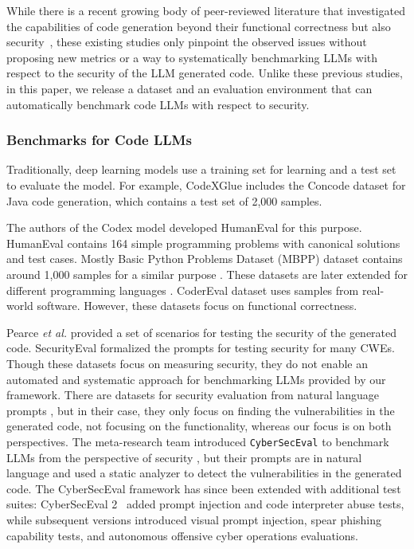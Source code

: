 \documentclass[pdflatex,sn-mathphys-ay]{sn-jnl}
\newcommand{\etal}{\textit{et al.} }
\begin{document}
While there is a recent growing body of peer-reviewed literature that investigated the capabilities of code generation beyond their functional correctness but also security~\cite{dakhel2023github,sobania2022choose,nguyen2022empirical,pearce2021,sandoval2022security,perry2022users},  these existing studies only pinpoint the observed issues without proposing new metrics or a way to systematically benchmarking LLMs with respect to the security of the LLM generated code. Unlike these previous studies, in this paper, we release a dataset and an evaluation environment that can automatically benchmark code LLMs with respect to security.



\subsubsection{Benchmarks for Code LLMs}

Traditionally, deep learning models use a training set for learning and a test set to evaluate the model. For example, CodeXGlue \cite{codexglue} includes the Concode dataset \cite{iyer2018mapping}  for Java code generation, which contains a test set of 2,000 samples. 


The authors of the Codex \cite{chen2021codex} model developed HumanEval for this purpose. HumanEval contains 164 simple programming problems with canonical solutions and test cases. Mostly Basic Python Problems Dataset (MBPP) dataset contains around 1,000 samples for a similar purpose \cite{austin2021program}. These datasets are later extended for different programming languages \cite{zheng2023codegeex, MBXP}. CoderEval dataset \cite{yu2023codereval} uses samples from real-world software. However, these datasets focus on functional correctness. 

Pearce \etal \cite{pearce2021} provided a set of scenarios for testing the security of the generated code. SecurityEval \cite{siddiq2022seceval} formalized the prompts for testing security for many CWEs. Though these datasets focus on measuring security, they do not enable an automated and systematic approach for benchmarking LLMs provided by our framework. There are datasets for security evaluation from natural language prompts \cite{CodeLMSec}, but in their case, they only focus on finding the vulnerabilities in the generated code, not focusing on the functionality, whereas our focus is on both perspectives. 
The meta-research team introduced \texttt{CyberSecEval} to benchmark LLMs from the perspective of security \cite{bhatt2023purple}, but their prompts are in natural language and used a static analyzer to detect the vulnerabilities in the generated code. The CyberSecEval framework has since been extended with additional test suites: CyberSecEval 2~\cite{bhatt2024cyberseceval2} added prompt injection and code interpreter abuse tests, while subsequent versions introduced visual prompt injection, spear phishing capability tests, and autonomous offensive cyber operations evaluations.
\end{document}
